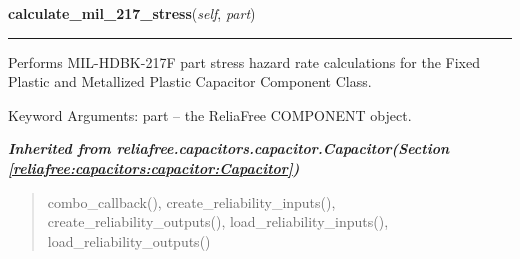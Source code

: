\hspace{.8\funcindent}\begin{boxedminipage}{\funcwidth}

    \raggedright \textbf{calculate\_mil\_217\_stress}(\textit{self}, \textit{part})

    \vspace{-1.5ex}

    \rule{\textwidth}{0.5\fboxrule}
\setlength{\parskip}{2ex}
    Performs MIL-HDBK-217F part stress hazard rate calculations for the 
    Fixed Plastic and Metallized Plastic Capacitor Component Class.

    Keyword Arguments: part -- the ReliaFree COMPONENT object.

\setlength{\parskip}{1ex}
    \end{boxedminipage}


\large{\textbf{\textit{Inherited from reliafree.capacitors.capacitor.Capacitor\textit{(Section \ref{reliafree:capacitors:capacitor:Capacitor})}}}}

\begin{quote}
combo\_callback(), create\_reliability\_inputs(), create\_reliability\_outputs(), load\_reliability\_inputs(), load\_reliability\_outputs()
\end{quote}
